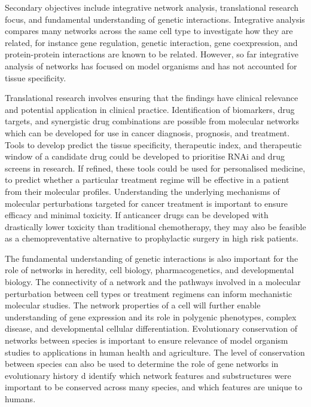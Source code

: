 Secondary objectives include integrative network analysis, translational research focus, and fundamental understanding of genetic interactions. Integrative analysis compares many networks across the same cell type to investigate how they are related, for instance gene regulation, genetic interaction, gene coexpression, and protein-protein interactions are known to be related. However, so far integrative analysis of networks has focused on model organisms and has not accounted for tissue specificity.

Translational research involves ensuring that the findings have clinical relevance and potential application in clinical practice. Identification of biomarkers, drug targets, and synergistic drug combinations are possible from molecular networks which can be developed for use in cancer diagnosis, prognosis, and treatment. Tools to develop predict the tissue specificity, therapeutic index, and therapeutic window of a candidate drug could be developed to prioritise RNAi and drug screens in research. If refined, these tools could be used for personalised medicine, to predict whether a particular treatment regime will be effective in a patient from their molecular profiles. Understanding the underlying mechanisms of molecular perturbations targeted for cancer treatment is important to ensure efficacy and minimal toxicity. If anticancer drugs can be developed with drastically lower toxicity than traditional chemotherapy, they may also be feasible as a chemopreventative alternative to prophylactic surgery in high risk patients.

The fundamental understanding of genetic interactions is also important for the role of networks in heredity, cell biology, pharmacogenetics, and developmental biology. The connectivity of a network and the pathways involved in a molecular perturbation between cell types or treatment regimens can inform mechanistic molecular studies. The network properties of a cell will further enable understanding of gene expression and its role in polygenic phenotypes, complex disease, and developmental cellular differentiation. Evolutionary conservation of networks between species is important to ensure relevance of model organism studies to applications in human health and agriculture. The level of conservation between species can also be used to determine the role of gene networks in evolutionary history d identify which network features and substructures were important to be conserved across many species, and which features are unique to humans.

